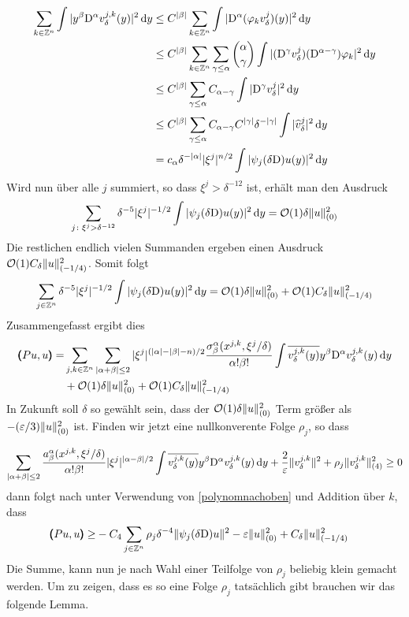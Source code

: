 \begin{align}
\sum_{k\in\mathbb Z^n} \int|y^\beta\mathrm D^\alpha v^{j,k}_\delta(y)|^2\,\mathrm d y &\le C^{\lvert\beta\rvert} \sum_{k\in\mathbb Z^n} \int |\mathrm D^\alpha(\varphi_k v^j_\delta)(y)|^2\,\mathrm d y \nonumber\\
&\le C^{\lvert\beta\rvert} \sum_{k\in\mathbb Z^n}\sum_{\gamma\le\alpha}\binom{\alpha}{\gamma}\int |(\mathrm D^\gamma v^j_\delta)(\mathrm D^{\alpha-\gamma})\varphi_k|^2\,\mathrm d y\nonumber\\
&\le C^{\lvert\beta\rvert}\sum_{\gamma\le\alpha}C_{\alpha-\gamma}\int |\mathrm D^\gamma v^j_\delta|^2\,\mathrm d y\nonumber\\
&\le C^{\lvert\beta\rvert}\sum_{\gamma\le\alpha}C_{\alpha-\gamma}C^{\lvert\gamma\rvert}\delta^{-\lvert\gamma\rvert}\int |\widehat v^j_\delta|^2\,\mathrm d y\nonumber\\
&= c_\alpha \delta^{-\lvert\alpha\rvert}|\xi^j|^{n/2}\int |\psi_j(\delta\mathrm D)u(y)|^2\,\mathrm d y\label{polynomnachoben}
\end{align}
Wird nun über alle $j$ summiert, so dass $\xi^j>\delta^{-12}$ ist, erhält man den Ausdruck
\begin{align}
\sum_{j\colon \xi^j>\delta^{-12}} \delta^{-5} |\xi^j|^{-1/2}\int |\psi_j(\delta\mathrm D)u(y)|^2\,\mathrm d y = \mathcal O(1)\delta\lVert u\rVert _{(0)}^2
\end{align}
Die restlichen endlich vielen Summanden ergeben einen Ausdruck $\mathcal O(1)C_\delta \lVert u\rVert _{(-1/4)}^2$. Somit folgt
\begin{align}
\sum_{j\in\mathbb Z^n}\delta^{-5} |\xi^j|^{-1/2}\int |\psi_j(\delta\mathrm D)u(y)|^2\,\mathrm d y = \mathcal O(1)\delta\lVert u\rVert _{(0)}^2 + \mathcal O(1)C_\delta \lVert u\rVert _{(-1/4)}^2
\end{align}
Zusammengefasst ergibt dies
\begin{align}
\pmb(Pu,u\pmb)
=& \sum_{j,k\in\mathbb Z^n}\sum_{\lvert\alpha+\beta\rvert\le 2}|\xi^j|^{(\lvert\alpha\rvert-\lvert\beta\rvert-n)/2} \frac{\sigma^\alpha_\beta(x^{j,k},\xi^j/\delta)}{\alpha!\beta!}\int\overline{v^{j,k}_\delta(y)}y^\beta\mathrm D^\alpha v^{j,k}_\delta(y)\,\mathrm d y\\
&+\mathcal O(1)\delta\lVert u\rVert _{(0)}^2 + \mathcal O(1)C_\delta \lVert u\rVert _{(-1/4)}^2\nonumber
\end{align}
In Zukunft soll $\delta$ so gewählt sein, dass der $\mathcal O(1)\delta\lVert u\rVert ^2_{(0)}$ Term größer als $-(\varepsilon/3)\lVert u\rVert ^2_{(0)}$ ist. Finden wir jetzt eine nullkonverente Folge $\rho_j$, so dass

\begin{align}
\sum_{|\alpha+\beta|\le 2} \frac{a^\alpha_\beta(x^{j,k},\xi^j/\delta)}{\alpha!\beta!}|\xi^j|^{|\alpha-\beta|/2}\int \overline{v^{j,k}_\delta(y)}y^\beta\mathrm D^\alpha v^{j,k}_\delta(y)\,\mathrm d y + \frac{2}{\varepsilon}\lVert v^{j,k}_\delta\rVert^2 + \rho_j \lVert v^{j,k}_\delta\rVert_{(4)}^2 \ge 0
\end{align}
dann folgt nach unter Verwendung von \eqref{polynomnachoben} und Addition über $k$,  dass 
\begin{align}
\pmb(Pu,u\pmb)
\ge& -C_4\sum_{j\in\mathbb Z^n} \rho_j \delta^{-4}\lVert\psi_j(\delta\mathrm D)u\rVert^2 - \varepsilon \lVert u\rVert _{(0)}^2 + C_\delta \lVert u\rVert _{(-1/4)}^2\nonumber
\end{align}
Die Summe, kann nun je nach Wahl einer Teilfolge von $\rho_j$ beliebig klein gemacht werden. Um zu zeigen, dass es so eine Folge $\rho_j$ tatsächlich gibt brauchen wir das folgende Lemma.

